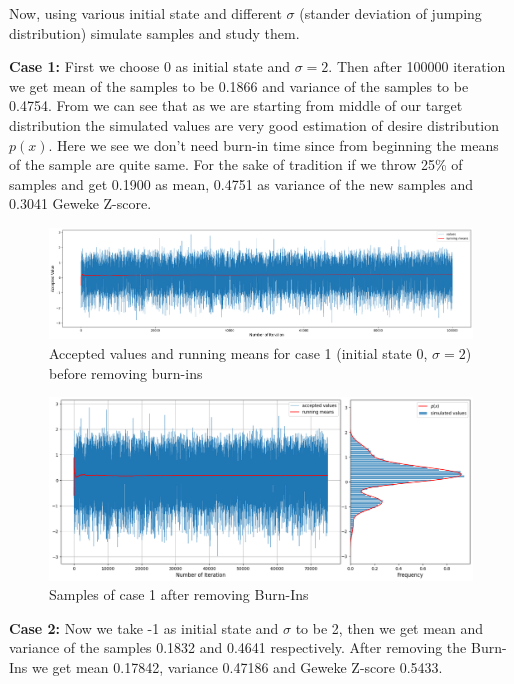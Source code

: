 \begin{example}
	Now, using various initial state and different $ \sigma $ (stander deviation of jumping distribution) simulate samples and study them.

	\textbf{Case 1:} First we choose $ 0 $ as initial state and $ \sigma = 2 $. Then after 100000 iteration we get mean of the samples to be 0.1866 and variance of the samples to be 0.4754.
	From  we can see that as we are starting from middle of our target distribution the simulated values are very good estimation of desire distribution $ p(x) $. Here we see we don't need burn-in time since from beginning the means of the sample are quite same. For the sake of tradition if we throw 25\% of samples and get 0.1900 as mean, 0.4751 as variance of the new samples and 0.3041 Geweke Z-score.

	\begin{figure}[H]
		\centering
		\includegraphics[width=1\textwidth]{./images/metropolis/example1/sample-1-values.png}
		\caption{Accepted values and running means for case 1 (initial state 0, $ \sigma = 2 $) before removing burn-ins}
		\label{fig:MH sample 1 values}
	\end{figure}

	\begin{figure}[H]
		\centering
		\includegraphics[width=1\textwidth]{./images/metropolis/example1/sample-1-value-hist-bo.png}
		\caption{Samples of case 1 after removing Burn-Ins}
		\label{fig:MH sample 1 after burn-in}
	\end{figure}

	\textbf{Case 2:}  Now we take -1 as initial state and $ \sigma $ to be 2, then we get mean and variance of the samples 0.1832 and 0.4641 respectively. After removing the Burn-Ins we get mean 0.17842, variance 0.47186 and Geweke Z-score 0.5433.


\end{example}

